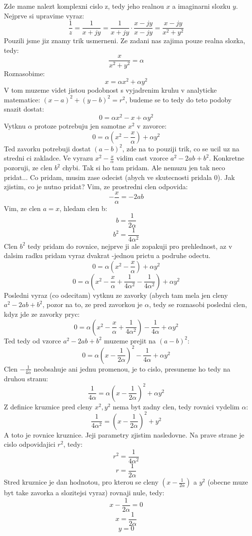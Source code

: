 Zde mame nalezt komplexni cislo z, tedy jeho realnou $x$ a imaginarni slozku $y$. Nejprve si upravime vyraz:
$$\frac{1}{z} = \frac{1}{x+jy} = \frac{1}{x+jy}\cdot \frac{x-jy}{x-jy} = \frac{x-jy}{x^2+y^2}$$
Pouzili jsme jiz znamy trik usmerneni. Ze zadani nas zajima pouze realna slozka, tedy:
$$\frac{x}{x^2+y^2} = \alpha$$
Roznasobime:
$$x = \alpha x^2 + \alpha y^2$$
V tom muzeme videt jistou podobnost s vyjadrenim kruhu v analyticke matematice: $(x-a)^2 + (y-b)^2 = r^2$, budeme se to tedy do teto podoby snazit dostat:
$$0 = \alpha x^2 - x + \alpha y^2$$
Vytknu $\alpha$ protoze potrebuju jen samotne $x^2$ v zavorce:
$$0 = \alpha (x^2 - \frac{x}{\alpha})+\alpha y^2$$
Ted zavorku potrebuji dostat $(a-b)^2$, zde na to pouziji trik, co se ucil uz na stredni ci zakladce. Ve vyrazu $x^2 - \frac{x}{\alpha}$ vidim cast vzorce $a^2-2ab+b^2$. Konkretne pozoruji, ze clen $b^2$ chybi. Tak si ho tam pridam. Ale nemuzu jen tak neco pridat... Co pridam, musim zase odecist (abych ve skutecnosti pridala 0). Jak zjistim, co je nutno pridat? Vim, ze prostredni clen odpovida:
$$-\frac{x}{\alpha} = -2ab$$
Vim, ze clen $a = x$, hledam clen b:
$$b = \frac{1}{2\alpha}$$
$$b^2 = \frac{1}{4 \alpha^2}$$
Clen $b^2$ tedy pridam do rovnice, nejprve ji ale zopakuji pro prehlednost, az v dalsim radku pridam vyraz dvakrat -jednou prictu a podruhe odectu.
$$0 = \alpha (x^2 - \frac{x}{\alpha})+\alpha y^2$$
$$0 = \alpha  \left(x^2 - \frac{x}{\alpha} + \frac{1}{4 \alpha^2} - \frac{1}{4 \alpha^2}\right) +\alpha y^2$$
Posledni vyraz (co odecitam) vytknu ze zavorky (abych tam mela jen cleny $a^2-2ab+b^2$, pozor na to, ze pred zavorkou je $\alpha$, tedy se roznasobi posledni clen, kdyz jde ze zavorky pryc:
$$0 = \alpha \left(x^2 - \frac{x}{\alpha} + \frac{1}{4 \alpha^2}\right)- \frac{1}{4 \alpha} +\alpha y^2$$
Ted tedy od vzorce  $a^2-2ab+b^2$ muzeme prejit na $(a-b)^2$:
$$0 = \alpha \left(x-\frac{1}{2\alpha}\right)^2  - \frac{1}{4 \alpha} +\alpha y^2$$
Clen $ - \frac{1}{4 \alpha}$ neobsahuje ani jednu promenou, je to cislo, presuneme ho tedy na druhou stranu:
$$ \frac{1}{4 \alpha} = \alpha \left(x-\frac{1}{2\alpha}\right)^2 +\alpha y^2$$
Z definice kruznice pred cleny $x^2, y^2$ nema byt zadny clen, tedy rovnici vydelim $\alpha$:
$$ \frac{1}{4 \alpha^2} = \left(x-\frac{1}{2\alpha}\right)^2 +y^2$$
A toto je rovnice kruznice. Jeji parametry zjistim nasledovne. Na prave strane je cislo odpovidajici $r^2$, tedy:
$$r^2 = \frac{1}{4\alpha^2}$$
$$r = \frac{1}{2\alpha}$$
Stred kruznice je dan hodnotou, pro kterou se cleny
$\left(x-\frac{1}{2\alpha}\right)$ a $y^2$ (obecne muze byt take zavorka a slozitejsi vyraz) rovnaji nule, tedy:
$$x-\frac{1}{2\alpha} = 0$$
$$x = \frac{1}{2\alpha}$$
$$y = 0$$

